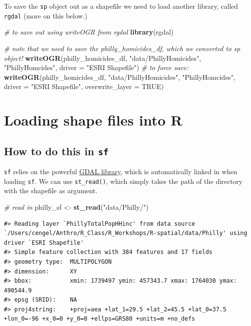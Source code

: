 \documentclass[]{book}
\newenvironment{Shaded}{\begin{snugshade}}{\end{snugshade}}
\newcommand{\KeywordTok}[1]{\textcolor[rgb]{0.13,0.29,0.53}{\textbf{#1}}}
\newcommand{\DataTypeTok}[1]{\textcolor[rgb]{0.13,0.29,0.53}{#1}}
\newcommand{\StringTok}[1]{\textcolor[rgb]{0.31,0.60,0.02}{#1}}
\newcommand{\CommentTok}[1]{\textcolor[rgb]{0.56,0.35,0.01}{\textit{#1}}}
\newcommand{\OtherTok}[1]{\textcolor[rgb]{0.56,0.35,0.01}{#1}}
\newcommand{\NormalTok}[1]{#1}
\begin{document}
To save the \texttt{sp} object out as a shapefile we need to load
another library, called \texttt{rgdal} (more on this below.)

\begin{Shaded}
\begin{Highlighting}[]
\CommentTok{# to save out using writeOGR from rgdal}
\KeywordTok{library}\NormalTok{(rgdal)}

\CommentTok{# note that we need to save the philly_homicides_df, which we converted to sp object!}
\KeywordTok{writeOGR}\NormalTok{(philly_homicides_df, }\StringTok{"data/PhillyHomicides"}\NormalTok{, }\StringTok{"PhillyHomcides"}\NormalTok{, }\DataTypeTok{driver =} \StringTok{"ESRI Shapefile"}\NormalTok{)}
\CommentTok{# to force save:}
\KeywordTok{writeOGR}\NormalTok{(philly_homicides_df, }\StringTok{"data/PhillyHomicides"}\NormalTok{, }\StringTok{"PhillyHomcides"}\NormalTok{, }\DataTypeTok{driver =} \StringTok{"ESRI Shapefile"}\NormalTok{, }\DataTypeTok{overwrite_layer =} \OtherTok{TRUE}\NormalTok{)}
\end{Highlighting}
\end{Shaded}

\section{Loading shape files into R}\label{loading-shape-files-into-r}

\subsection{\texorpdfstring{How to do this in
\texttt{sf}}{How to do this in sf}}\label{how-to-do-this-in-sf}

\texttt{sf} relies on the powerful \href{http://gdal.org}{GDAL library},
which is automatically linked in when loading \texttt{sf}. We can use
\texttt{st\_read()}, which simply takes the path of the directory with
the shapefile as argument.

\begin{Shaded}
\begin{Highlighting}[]
\CommentTok{# read in}
\NormalTok{philly_sf <-}\StringTok{ }\KeywordTok{st_read}\NormalTok{(}\StringTok{"data/Philly/"}\NormalTok{)}
\end{Highlighting}
\end{Shaded}

\begin{verbatim}
#> Reading layer `PhillyTotalPopHHinc' from data source `/Users/cengel/Anthro/R_Class/R_Workshops/R-spatial/data/Philly' using driver `ESRI Shapefile'
#> Simple feature collection with 384 features and 17 fields
#> geometry type:  MULTIPOLYGON
#> dimension:      XY
#> bbox:           xmin: 1739497 ymin: 457343.7 xmax: 1764030 ymax: 490544.9
#> epsg (SRID):    NA
#> proj4string:    +proj=aea +lat_1=29.5 +lat_2=45.5 +lat_0=37.5 +lon_0=-96 +x_0=0 +y_0=0 +ellps=GRS80 +units=m +no_defs
\end{verbatim}
\end{document}
